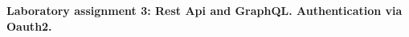 
\pagebreak
\begin{center}
\textbf{Laboratory assignment 3: Rest Api and GraphQL. Authentication via Oauth2.}
\end{center}

\medskip
